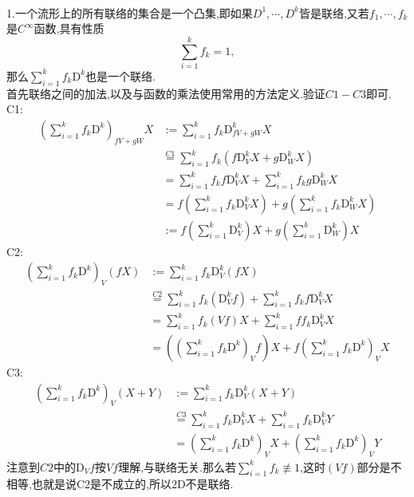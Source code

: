 \documentclass[a4paper]{ctexart}
\begin{document}
\pagestyle{plain}
\noindent
{}
\\
1.一个流形上的所有联络的集合是一个凸集,即如果$D^1,\cdots ,D^k$皆是联络,又若$f_1,\cdots ,f_k$是$C^\infty$函数,具有性质
\[\sum_{i=1}^kf_k=1,\]
那么$\sum\limits_{i=1}^kf_k\mathrm{D}^k$也是一个联络.\\
首先联络之间的加法,以及与函数的乘法使用常用的方法定义.验证$C1-C3$即可.\\
C1:
\begin{align*}
\left( \sum_{i=1}^kf_k\mathrm{D}^k\right) _{fV+gW}X 
&:=\sum\limits_{i=1}^kf_k\mathrm{D}^k _{fV+gW}X\\
&\overset{C1}{=}\sum\limits_{i=1}^kf_k\left(f\mathrm{D}^k _{V}X+g\mathrm{D}^k _{W}X \right)\\
& =\sum_{i=1}^kf_kf\mathrm{D}^k _{V}X+\sum_{i=1}^kf_kg\mathrm{D}^k _{W}X\\
&=f\left( \sum_{i=1}^kf_k\mathrm{D}^k _{V}X\right) +g\left( \sum_{i=1}^kf_k\mathrm{D}^k _{W}X\right) \\
&:=f\left(  \sum_{i=1}^k\mathrm{D}_V^k\right)X + g\left( \sum_{i=1}^k\mathrm{D}_W^k\right)X
\end{align*}
C2:
\begin{align*}
\left( \sum_{i=1}^kf_k\mathrm{D}^k\right)_V(fX)&:= \sum_{i=1}^kf_k\mathrm{D}^k_V(fX)\\
&\overset{C2}{=}\sum_{i=1}^kf_k\left( \mathrm{D}^k_Vf\right)+\sum_{i=1}^kf_kf \mathrm{D}_V^kX\\
&=\sum_{i=1}^kf_k\left(Vf\right)X+\sum_{i=1}^kff_k \mathrm{D}_V^kX\\
&=\left( \left( \sum_{i=1}^kf_k\mathrm{D}^k\right)_Vf\right)X+f \left( \sum_{i=1}^kf_k\mathrm{D}^k\right)_VX 
\end{align*}
C3:
\begin{align*}
\left( \sum_{i=1}^kf_k\mathrm{D}^k\right) _V(X+Y)&:=\sum_{i=1}^kf_k\mathrm{D}^k_V(X+Y)\\
&\overset{C3}{=}\sum_{i=1}^kf_k\mathrm{D}^k_VX+\sum_{i=1}^kf_k\mathrm{D}^k_VY\\
&=\left( \sum_{i=1}^kf_k\mathrm{D}^k\right) _VX+\left( \sum_{i=1}^kf_k\mathrm{D}^k\right) _VY
\end{align*}
注意到$C2$中的$\mathrm{D}_Vf$按$Vf$理解,与联络无关.那么若$\sum_{i=1}^kf_k\not\equiv 1$,这时$(Vf)$部分是不相等,也就是说C2是不成立的,所以$2\mathrm{D}$不是联络.
\end{document}

